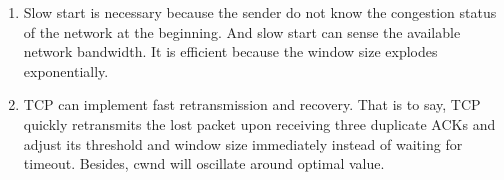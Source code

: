 \documentclass{article}
\begin{document}
\begin{enumerate}
\begin{enumerate}
    \end{enumerate}
    
    \item
    Slow start is necessary because the sender do not know the congestion status of the network at the beginning. And slow start can sense the available network bandwidth.
    \newline
    It is efficient because the window size explodes exponentially.
    
    \item
    TCP can implement fast retransmission and recovery. That is to say, TCP quickly retransmits the lost packet upon receiving three duplicate ACKs and adjust its threshold and window size immediately instead of waiting for timeout. Besides, cwnd will oscillate around optimal value.
    
\end{enumerate}
\end{document}
